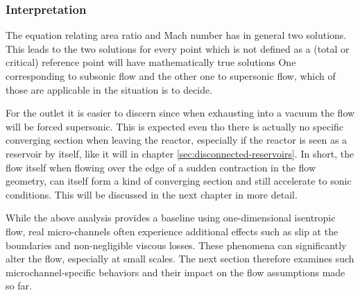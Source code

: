 \subsubsection*{Interpretation}
	The equation relating area ratio and Mach number has in general two solutions.
	This leads to the two solutions for every point which is not defined as a (total or critical) reference point will have mathematically true solutions
	One corresponding to subsonic flow and the other one to supersonic flow, which of those are applicable in the situation is to decide.

	For the outlet it is easier to discern since when exhausting into a vacuum the flow will be forced supersonic.
	This is expected even tho there is actually no specific converging section when leaving the reactor, especially if the reactor is seen as a reservoir by itself, like it will in chapter \ref{sec:disconnected-reservoirs}.
	In short, the flow itself when flowing over the edge of a sudden contraction in the flow geometry, can itself form a kind of converging section and still accelerate to sonic conditions.
	This will be discussed in the next chapter in more detail.

	While the above analysis provides a baseline using one-dimensional isentropic flow, real micro-channels often experience additional effects such as slip at the boundaries and non-negligible viscous losses.
	These phenomena can significantly alter the flow, especially at small scales.
	The next section therefore examines such microchannel-specific behaviors and their impact on the flow assumptions made so far.
